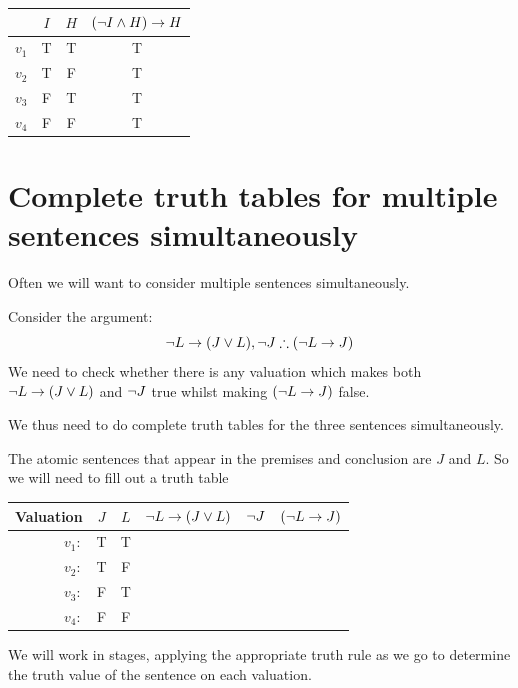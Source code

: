 \begin{center}
	\begin{tabular}{rcc|c}
		&$I$&$H$&$(\neg I\mathbin{\wedge} H)\rightarrow H$\\\hline
		$v_1$&T&T&T\\
		$v_2$&T&F&T\\
		$v_3$&F&T&T\\
		$v_4$&F&F&T
	\end{tabular}
\end{center}



\section{Complete truth tables for multiple sentences simultaneously}

Often we will want to consider multiple sentences simultaneously. 

Consider the argument:
$$\enot L \eif (J \eor L),\enot J\therefore (\enot L\eif J)$$
We need to check whether there is any valuation which makes both $\neg L \rightarrow (J \vee L)$ and $\neg J$ true whilst making $(\neg L\rightarrow J) $ false. 

We thus need to do complete truth tables for the three sentences simultaneously. 


The atomic sentences that appear in the premises and conclusion are $J$ and $L$. So we will need to fill out a truth table

\begin{center}
	\begin{tabular}{rcc|c|c|c}
		Valuation&$J$&$L$&$\neg L \rightarrow (J \vee L)$&$\neg J$ & $(\neg L\rightarrow J)$\\\hline
		$v_1:$&T&T&&&\\
		$v_2:$&T&F&&&\\
		$v_3:$&F&T&&&\\
		$v_4:$&F&F&&
	\end{tabular}
\end{center}

We will work in stages, applying the appropriate truth rule as we go to determine the truth value of the sentence on each valuation. 

